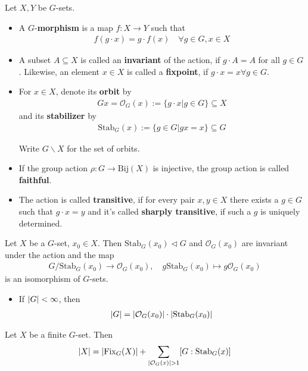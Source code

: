 \begin{dfn}[]
Let $X,Y$ be $G$-sets.
\begin{itemize}
  \item A $G$-\textbf{morphism} is a map $f: X \to Y$ such that
    \begin{align*}
      f(g \cdot x) = g \cdot f(x) \quad \forall g \in G, x\in X
    \end{align*}
  \item A subset $A \subseteq X$ is called an \textbf{invariant} of the action, if $g \cdot A = A$ for all $g \in G$.
    Likewise, an element $x \in X$ is called a \textbf{fixpoint}, if $g \cdot x = x \forall g \in G$.
  \item For $x \in X$, denote its \textbf{orbit} by
    \begin{align*}
      G x = \mathcal{O}_G(x) := \{g \cdot x \big\vert g \in G\} \subseteq X
    \end{align*}
    and its \textbf{stabilizer} by
    \begin{align*}
      \text{Stab}_G(x) := \{g \in G \big\vert gx = x\} \subseteq G
    \end{align*}

    Write $G \backslash X$ for the set of orbits.

  \item If the group action $\rho: G \to \text{Bij}(X)$ is injective, the group action is called \textbf{faithful}.
  \item The action is called \textbf{transitive}, if for every pair $x,y \in X$ there exists a $g \in G$ such that $g \cdot x = y$ and it's called \textbf{sharply transitive}, if such a $g$ is uniquely determined.
\end{itemize}

\end{dfn}


\begin{thm}
  Let $X$ be a $G$-set, $x_0 \in X$. Then $\text{Stab}_G(x_0) \lhd G$ and $\mathcal{O}_G(x_0)$ are invariant under the action and the map
  \begin{align*}
    G/\text{Stab}_G(x_0) \to \mathcal{O}_G(x_0), \quad g \text{Stab}_G(x_0) \mapsto g \mathcal{O}_G(x_0)
  \end{align*}
  is an isomorphism of $G$-sets.
\end{thm}

\begin{itemize}
  \item If $\vert G\vert < \infty$, then 
    \begin{align*}
      \vert G\vert = \vert\mathcal{O}_G(x_0)\vert \cdot \vert\text{Stab}_G(x_0)\vert
    \end{align*}
\end{itemize}

\begin{cor}[]
  Let $X$ be a finite $G$-set. Then
  \begin{align*}
    \vert X\vert = \vert\text{Fix}_G(X)\vert + \sum_{\vert\mathcal{O}_G(x)\vert > 1} [G : \text{Stab}_G(x)]
  \end{align*}
\end{cor}





